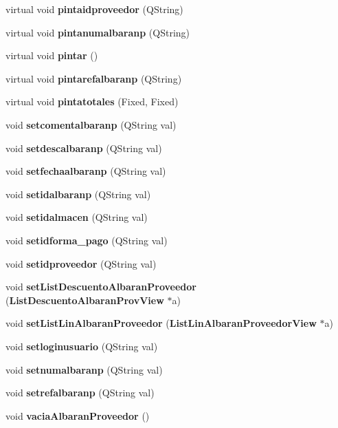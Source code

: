 \begin{CompactItemize}
\item 
virtual void {\bf pintaidproveedor} (QString)\label{classAlbaranProveedor_a13}

\item 
virtual void {\bf pintanumalbaranp} (QString)\label{classAlbaranProveedor_a14}

\item 
virtual void {\bf pintar} ()
\item 
virtual void {\bf pintarefalbaranp} (QString)\label{classAlbaranProveedor_a16}

\item 
virtual void {\bf pintatotales} (Fixed, Fixed)\label{classAlbaranProveedor_a17}

\item 
void {\bf setcomentalbaranp} (QString val)\label{classAlbaranProveedor_a18}

\item 
void {\bf setdescalbaranp} (QString val)\label{classAlbaranProveedor_a19}

\item 
void {\bf setfechaalbaranp} (QString val)\label{classAlbaranProveedor_a20}

\item 
void {\bf setidalbaranp} (QString val)\label{classAlbaranProveedor_a21}

\item 
void {\bf setidalmacen} (QString val)\label{classAlbaranProveedor_a22}

\item 
void {\bf setidforma\_\-pago} (QString val)\label{classAlbaranProveedor_a23}

\item 
void {\bf setidproveedor} (QString val)\label{classAlbaranProveedor_a24}

\item 
void {\bf set\-List\-Descuento\-Albaran\-Proveedor} ({\bf List\-Descuento\-Albaran\-Prov\-View} $\ast$a)\label{classAlbaranProveedor_a25}

\item 
void {\bf set\-List\-Lin\-Albaran\-Proveedor} ({\bf List\-Lin\-Albaran\-Proveedor\-View} $\ast$a)
\item 
void {\bf setloginusuario} (QString val)\label{classAlbaranProveedor_a27}

\item 
void {\bf setnumalbaranp} (QString val)\label{classAlbaranProveedor_a28}

\item 
void {\bf setrefalbaranp} (QString val)\label{classAlbaranProveedor_a29}

\item 
void {\bf vacia\-Albaran\-Proveedor} ()\label{classAlbaranProveedor_a30}

\end{CompactItemize}
